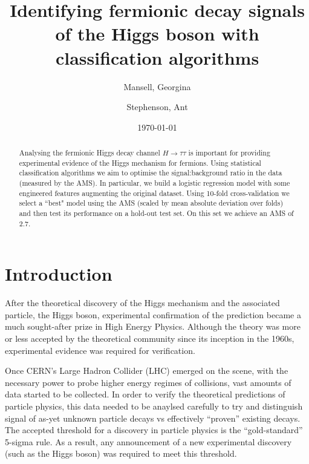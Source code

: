 

\usepackage[toc,page]{appendix}
\usepackage{fancyhdr}
\usepackage{enumitem}
\usepackage{pifont}

\graphicspath{{./figs/}}

\pagestyle{fancy}
\rhead{}
\lhead{}

\author{Mansell, Georgina \and Stephenson, Ant}
\date{\today}
\title{Identifying fermionic decay signals of the Higgs boson with classification algorithms}


\maketitle
\begin{abstract}
    Analysing the fermionic Higgs decay channel $H\rightarrow\tau\tau$ is important for providing experimental evidence of the Higgs mechanism for fermions. Using statistical classification algorithms we aim to optimise the signal:background ratio in the data (measured by the AMS). In particular, we build a logistic regression model with some engineered features augmenting the original dataset. Using 10-fold cross-validation we select a ``best" model using the AMS (scaled by mean absolute deviation over folds) and then test its performance on a hold-out test set. On this set we achieve an AMS of 2.7.
\end{abstract}

\section{Introduction}
After the theoretical discovery of the Higgs mechanism and the associated particle, the Higgs boson, experimental confirmation of the prediction became a much sought-after prize in High Energy Physics. Although the theory was more or less accepted by the theoretical community since its inception in the 1960s, experimental evidence was required for verification. 

Once CERN's Large Hadron Collider (LHC) emerged on the scene, with the necessary power to probe higher energy regimes of collisions, vast amounts of data started to be collected. In order to verify the theoretical predictions of particle physics, this data needed to be anaylsed carefully to try and distinguish signal of as-yet unknown particle decays vs effectively ``proven'' existing decays. The accepted threshold for a discovery in particle physics is the ``gold-standard'' 5-sigma rule. As a result, any announcement of a new experimental discovery (such as the Higgs boson) was required to meet this threshold. 

